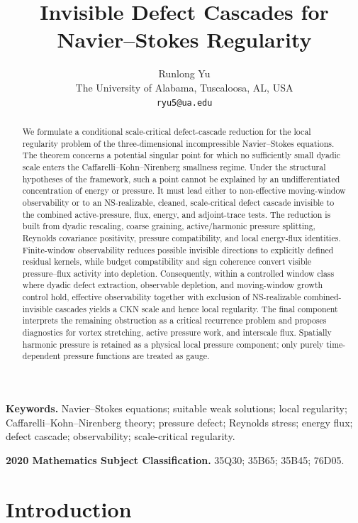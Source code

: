 \documentclass[11pt]{article}
\title{\textbf{Invisible Defect Cascades for Navier--Stokes Regularity}}
\author{Runlong Yu\\
	The University of Alabama, Tuscaloosa, AL, USA\\
	\texttt{ryu5@ua.edu}}
\date{}
\numberwithin{equation}{section}
\theoremstyle{plain}
\theoremstyle{definition}
\theoremstyle{remark}
\begin{document}
\maketitle

\begin{abstract}
	We formulate a conditional scale-critical defect-cascade reduction for the local regularity problem of the three-dimensional incompressible Navier--Stokes equations.  The theorem concerns a potential singular point for which no sufficiently small dyadic scale enters the Caffarelli--Kohn--Nirenberg smallness regime.  Under the structural hypotheses of the framework, such a point cannot be explained by an undifferentiated concentration of energy or pressure.  It must lead either to non-effective moving-window observability or to an NS-realizable, cleaned, scale-critical defect cascade invisible to the combined active-pressure, flux, energy, and adjoint-trace tests. The reduction is built from dyadic rescaling, coarse graining, active/harmonic pressure splitting, Reynolds covariance positivity, pressure compatibility, and local energy-flux identities.  Finite-window observability reduces possible invisible directions to explicitly defined residual kernels, while budget compatibility and sign coherence convert visible pressure--flux activity into depletion.  Consequently, within a controlled window class where dyadic defect extraction, observable depletion, and moving-window growth control hold, effective observability together with exclusion of NS-realizable combined-invisible cascades yields a CKN scale and hence local regularity.  The final component interprets the remaining obstruction as a critical recurrence problem and proposes diagnostics for vortex stretching, active pressure work, and interscale flux.  Spatially harmonic pressure is retained as a physical local pressure component; only purely time-dependent pressure functions are treated as gauge.
\end{abstract}

\noindent\textbf{Keywords.} Navier--Stokes equations; suitable weak solutions; local regularity; Caffarelli--Kohn--Nirenberg theory; pressure defect; Reynolds stress; energy flux; defect cascade; observability; scale-critical regularity.

\medskip
\noindent\textbf{2020 Mathematics Subject Classification.} 35Q30; 35B65; 35B45; 76D05.

\tableofcontents

\section{Introduction}
\end{document}
